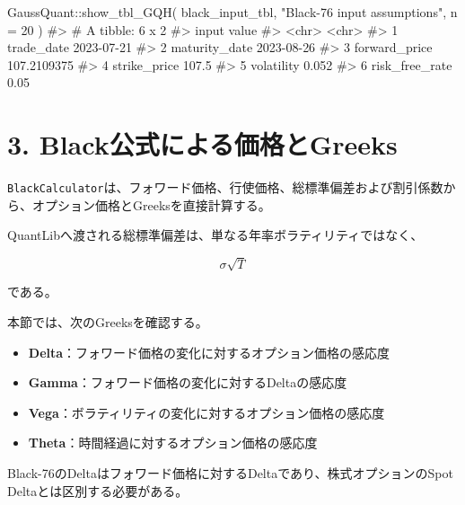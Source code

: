 \documentclass[
  letterpaper,
  DIV=11,
  numbers=noendperiod]{scrreprt}
\newenvironment{Shaded}{\begin{snugshade}}{\end{snugshade}}
\newcommand{\AttributeTok}[1]{\textcolor[rgb]{0.40,0.45,0.13}{#1}}
\newcommand{\CommentTok}[1]{\textcolor[rgb]{0.37,0.37,0.37}{#1}}
\newcommand{\DecValTok}[1]{\textcolor[rgb]{0.68,0.00,0.00}{#1}}
\newcommand{\FunctionTok}[1]{\textcolor[rgb]{0.28,0.35,0.67}{#1}}
\newcommand{\NormalTok}[1]{\textcolor[rgb]{0.00,0.23,0.31}{#1}}
\newcommand{\SpecialCharTok}[1]{\textcolor[rgb]{0.37,0.37,0.37}{#1}}
\newcommand{\StringTok}[1]{\textcolor[rgb]{0.13,0.47,0.30}{#1}}
\providecommand{\tightlist}{%
  \setlength{\itemsep}{0pt}\setlength{\parskip}{0pt}}
\begin{document}
\begin{Shaded}
\begin{Highlighting}[]
\NormalTok{GaussQuant}\SpecialCharTok{::}\FunctionTok{show\_tbl\_GQH}\NormalTok{(}
\NormalTok{  black\_input\_tbl,}
  \StringTok{"Black{-}76 input assumptions"}\NormalTok{,}
  \AttributeTok{n =} \DecValTok{20}
\NormalTok{)}
\CommentTok{\#\textgreater{} \# A tibble: 6 x 2}
\CommentTok{\#\textgreater{}   input          value      }
\CommentTok{\#\textgreater{}   \textless{}chr\textgreater{}          \textless{}chr\textgreater{}      }
\CommentTok{\#\textgreater{} 1 trade\_date     2023{-}07{-}21 }
\CommentTok{\#\textgreater{} 2 maturity\_date  2023{-}08{-}26 }
\CommentTok{\#\textgreater{} 3 forward\_price  107.2109375}
\CommentTok{\#\textgreater{} 4 strike\_price   107.5      }
\CommentTok{\#\textgreater{} 5 volatility     0.052      }
\CommentTok{\#\textgreater{} 6 risk\_free\_rate 0.05}
\end{Highlighting}
\end{Shaded}

\section{3.
Black公式による価格とGreeks}\label{blackux516cux5f0fux306bux3088ux308bux4fa1ux683cux3068greeks}

\texttt{BlackCalculator}は、フォワード価格、行使価格、総標準偏差および割引係数から、オプション価格とGreeksを直接計算する。

QuantLibへ渡される総標準偏差は、単なる年率ボラティリティではなく、

\[
\sigma\sqrt{T}
\]

である。

本節では、次のGreeksを確認する。

\begin{itemize}
\tightlist
\item
  \textbf{Delta}：フォワード価格の変化に対するオプション価格の感応度
\item
  \textbf{Gamma}：フォワード価格の変化に対するDeltaの感応度
\item
  \textbf{Vega}：ボラティリティの変化に対するオプション価格の感応度
\item
  \textbf{Theta}：時間経過に対するオプション価格の感応度
\end{itemize}

Black-76のDeltaはフォワード価格に対するDeltaであり、株式オプションのSpot
Deltaとは区別する必要がある。
\end{document}
